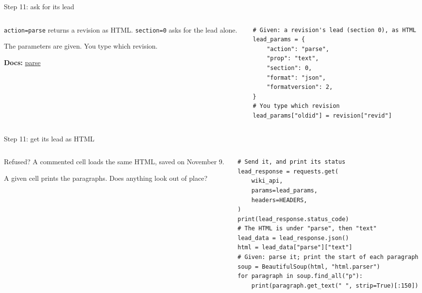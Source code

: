 \documentclass[9pt,aspectratio=169]{beamer}
\begin{document}
\begin{frame}[fragile]{Step 11: ask for its lead}
    \begin{columns}[T]
        \begin{column}{0.37\textwidth}
            \texttt{action=parse} returns a revision as HTML. \texttt{section=0} asks for the lead alone.

            \medskip
            The parameters are given. You type which revision.

            \medskip
            {\scriptsize\textbf{Docs:} \href{https://www.mediawiki.org/wiki/API:Parsing_wikitext}{parse}\par}
        \end{column}
        \begin{column}{0.6\textwidth}
\begin{lstlisting}
# Given: a revision's lead (section 0), as HTML
lead_params = {
    "action": "parse",
    "prop": "text",
    "section": 0,
    "format": "json",
    "formatversion": 2,
}
# You type which revision
lead_params["oldid"] = revision["revid"]
\end{lstlisting}
        \end{column}
    \end{columns}
\end{frame}

\begin{frame}[fragile]{Step 11: get its lead as HTML}
    \begin{columns}[T]
        \begin{column}{0.37\textwidth}
            Refused? A commented cell loads the same HTML, saved on November 9.

            \medskip
            A given cell prints the paragraphs. Does anything look out of place?
        \end{column}
        \begin{column}{0.6\textwidth}
\begin{lstlisting}
# Send it, and print its status
lead_response = requests.get(
    wiki_api,
    params=lead_params,
    headers=HEADERS,
)
print(lead_response.status_code)
# The HTML is under "parse", then "text"
lead_data = lead_response.json()
html = lead_data["parse"]["text"]
# Given: parse it; print the start of each paragraph
soup = BeautifulSoup(html, "html.parser")
for paragraph in soup.find_all("p"):
    print(paragraph.get_text(" ", strip=True)[:150])
\end{lstlisting}
        \end{column}
    \end{columns}
\end{frame}
\end{document}
